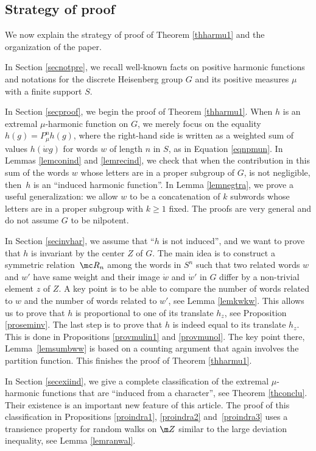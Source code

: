 \subsection{Strategy of proof}
\label{secstrpro}
\bq
We now explain the strategy of proof of Theorem \ref{thharmu1}
and the organization of the paper.
\eq

In Section \ref{secnotpre}, we recall well-known facts on positive harmonic functions
and notations for the discrete Heisenberg group $G$
and its positive measures $\mu$ with a finite support $S$.

In Section \ref{secproof}, we begin the proof of Theorem \ref{thharmu1}.
When $h$ is an extremal $\mu$-harmonic function on $G$, we merely focus on the
equality
$h(g)=P^n_\mu h(g)$, where the right-hand side is written as a weighted sum
of values $h(\dot{w}g)$ for words $w$ of length $n$ in $S$,
as in Equation \eqref{eqnpmun}.
In Lemmas \ref{lemconind} and \ref{lemrecind},
we check that when the contribution in this sum
of the words $w$ whose letters are in a proper subgroup of $G$,
is not negligible,
then~$h$ is an ``induced harmonic function''.
In Lemma \ref{lemnegtra}, we prove a useful generalization:
we allow $w$ to be a concatenation of $k$ subwords
whose letters are in a proper subgroup with $k \geq 1$ fixed.
The proofs are very general
and do not assume $G$ to be nilpotent.

In Section \ref{secinvhar}, we assume that ``$h$ is not induced'',
and we want to prove that $h$ is invariant by the center $Z$ of $G$.
The main idea is to construct a symmetric relation~$\mc R_n$
among the words in $S^n$ such that
two related words $w$ and $w'$ have same weight
and their image $\dot{w}$ and $\dot{w}'$ in $G$
differ by a non-trivial element $z$ of $Z$.
A key point is to be able to compare the number of words related to $w$
and the number of words related to $w'$, see Lemma \ref{lemkwkw}. This allows
us to prove that $h$ is proportional to one of its translate $h_z$,
see Proposition \ref{proseminv}.
The last step is to prove that $h$ is indeed equal to its translate $h_z$.
This is done in Propositions \ref{provmulin1} and \ref{provmunol}.
The key point there, Lemma~\ref{lemsumbww} is based
on a counting argument that again involves the partition function.
This finishes the proof of Theorem \ref{thharmu1}.

In Section \ref{secexiind}, we give a complete classification of the
extremal $\mu$-harmonic functions that are ``induced
from a character'',
see Theorem \ref{thconclu}.
Their existence is an important new feature of this article.
The proof of this classification in Propositions \ref{proindra1}, \ref{proindra2} and~\ref{proindra3}
uses a transience property for random walks on $\m Z$
similar to the large deviation inequality, see Lemma \ref{lemranwal}.

